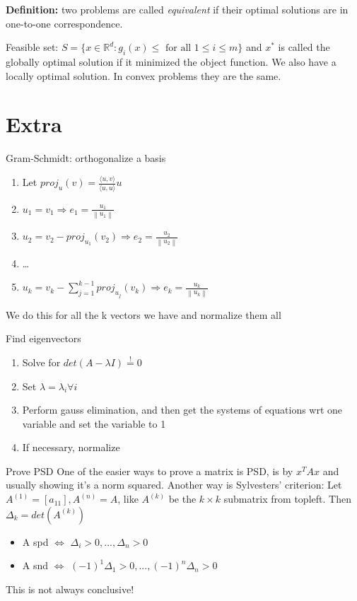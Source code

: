 \documentclass[a4paper]{article}
\begin{document}
\textbf{Definition:} two problems are called \textit{equivalent} if their optimal solutions are in one-to-one correspondence.  

Feasible set:
$S=\{x\in\mathbb{R}^d: g_i(x) \leq \text{ for all } 1\leq i \leq m\}$ and $x^*$ is called the globally optimal solution if it minimized the object function. We also have a locally optimal solution. In convex problems they are the same.



\section{Extra}
\begin{mainbox}{Gram-Schmidt: orthogonalize a basis}
 \begin{enumerate}
    \item Let $proj_u(v) = \frac{\langle u, v \rangle}{\langle u, u\rangle}u$ 
    \item $u_1 = v_1 \Rightarrow e_1 = \frac{u_1}{\left\lVert u_1\right\rVert } $
    \item $u_2 = v_2 - proj_{u_1}(v_2) \Rightarrow e_2 = \frac{u_2}{\left\lVert u_2\right\rVert }$
    \item \dots
    \item $u_k = v_k - \sum_{j=1}^{k-1}proj_{u_j}(v_k) \Rightarrow e_k = \frac{u_k}{\left\lVert u_k\right\rVert }$ 
 \end{enumerate}

 We do this for all the k vectors we have and normalize them all
 
\end{mainbox}

\begin{mainbox}{Find eigenvectors}
    \begin{enumerate}[leftmargin=7pt]
        \item Solve for $det(A-\lambda I) \overset{!}{=} 0 $
        \item Set $\lambda = \lambda_i \forall i$
        \item Perform gauss elimination, and then get the systems of equations wrt one variable and set the variable to 1
        \item If necessary, normalize
    \end{enumerate}
\end{mainbox}

\begin{subbox}{Prove PSD}
    One of the easier ways to prove a matrix is PSD, is by $x^TAx$ and usually showing it's a norm squared. Another way is Sylvesters' criterion:
    Let $A^{(1)} = [a_{11}], A^{(n)} = A$, like $A^{(k)}$ be the $k\times k$ submatrix from topleft. Then $\Delta_k = det(A^{(k)})$    
    \begin{itemize}
        \item A spd $\Leftrightarrow$ $\Delta_i > 0, ..., \Delta_n > 0$
        \item A snd $\Leftrightarrow$ $(-1)^1 \Delta_1 > 0, ..., (-1)^n \Delta_n > 0$  
    \end{itemize}
      This is not always conclusive!
\end{subbox}
\end{document}
